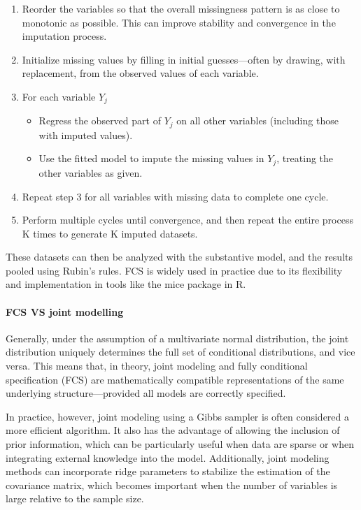 \documentclass{article}
\providecommand{\tightlist}{%
  \setlength{\itemsep}{0pt}\setlength{\parskip}{0pt}}
\begin{document}
\begin{enumerate}
\def\labelenumi{\arabic{enumi}.}
\item
  Reorder the variables so that the overall missingness pattern is as
  close to monotonic as possible. This can improve stability and
  convergence in the imputation process.
\item
  Initialize missing values by filling in initial guesses---often by
  drawing, with replacement, from the observed values of each variable.
\item
  For each variable \(Y_{j}\)

  \begin{itemize}
  \tightlist
  \item
    Regress the observed part of \(Y_{j}\) on all other variables
    (including those with imputed values).
  \item
    Use the fitted model to impute the missing values in \(Y_{j}\),
    treating the other variables as given.
  \end{itemize}
\item
  Repeat step 3 for all variables with missing data to complete one
  cycle.
\item
  Perform multiple cycles until convergence, and then repeat the entire
  process K times to generate K imputed datasets.
\end{enumerate}

These datasets can then be analyzed with the substantive model, and the
results pooled using Rubin's rules. FCS is widely used in practice due
to its flexibility and implementation in tools like the mice package in
R.

\paragraph{FCS VS joint modelling}\label{fcs-vs-joint-modelling}

Generally, under the assumption of a multivariate normal distribution,
the joint distribution uniquely determines the full set of conditional
distributions, and vice versa. This means that, in theory, joint
modeling and fully conditional specification (FCS) are mathematically
compatible representations of the same underlying structure---provided
all models are correctly specified.

In practice, however, joint modeling using a Gibbs sampler is often
considered a more efficient algorithm. It also has the advantage of
allowing the inclusion of prior information, which can be particularly
useful when data are sparse or when integrating external knowledge into
the model. Additionally, joint modeling methods can incorporate ridge
parameters to stabilize the estimation of the covariance matrix, which
becomes important when the number of variables is large relative to the
sample size.
\end{document}
